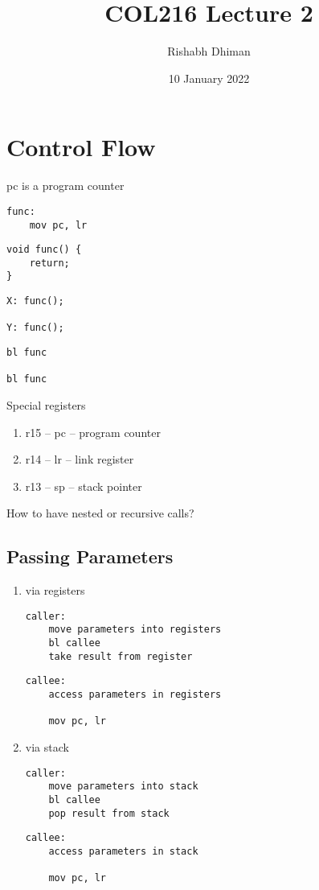 \documentclass{scrartcl}
\title{COL216 Lecture 2}
\author{Rishabh Dhiman}
\date{10 January 2022}
\begin{document}
\maketitle

\section{Control Flow}
pc is a program counter

\begin{lstlisting}
func:
	mov pc, lr
\end{lstlisting}
\begin{lstlisting}
void func() {
	return;
}
\end{lstlisting}

\begin{lstlisting}
X: func();

Y: func();
\end{lstlisting}

\begin{lstlisting}
bl func

bl func
\end{lstlisting}

Special registers
\begin{enumerate}
	\item r15 -- pc -- program counter
	\item r14 -- lr -- link register
	\item r13 -- sp -- stack pointer
\end{enumerate}

How to have nested or recursive calls?

\subsection{Passing Parameters}
\begin{enumerate}
	\item via registers
		\begin{lstlisting}
caller:
	move parameters into registers
	bl callee
	take result from register
		\end{lstlisting}
		\begin{lstlisting}
callee:
	access parameters in registers

	mov pc, lr
		\end{lstlisting}
	\item via stack
		\begin{lstlisting}
caller:
	move parameters into stack
	bl callee
	pop result from stack
		\end{lstlisting}
		\begin{lstlisting}
callee:
	access parameters in stack

	mov pc, lr
		\end{lstlisting}
\end{enumerate}
\end{document}
